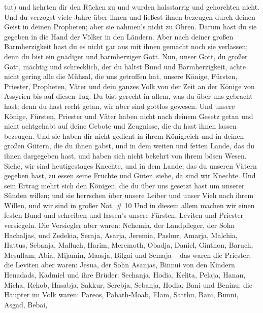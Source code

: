 tut) und kehrten dir den Rücken zu und wurden halsstarrig und gehorchten
nicht.  Und du verzogst viele Jahre über ihnen und ließest
ihnen bezeugen durch deinen Geist in deinen Propheten; aber sie nahmen's
nicht zu Ohren. Darum hast du sie gegeben in die Hand der Völker in den
Ländern.  Aber nach deiner großen Barmherzigkeit hast du es
nicht gar aus mit ihnen gemacht noch sie verlassen; denn du bist ein
gnädiger und barmherziger Gott.  Nun, unser Gott, du großer
Gott, mächtig und schrecklich, der du hältst Bund und Barmherzigkeit,
achte nicht gering alle die Mühsal, die uns getroffen hat, unsere
Könige, Fürsten, Priester, Propheten, Väter und dein ganzes Volk von der
Zeit an der Könige von Assyrien bis auf diesen Tag.  Du
bist gerecht in allem, was du über uns gebracht hast; denn du hast recht
getan, wir aber sind gottlos gewesen.  Und unsere Könige,
Fürsten, Priester und Väter haben nicht nach deinem Gesetz getan und
nicht achtgehabt auf deine Gebote und Zeugnisse, die du hast ihnen
lassen bezeugen.  Und sie haben dir nicht gedient in ihrem
Königreich und in deinen großen Gütern, die du ihnen gabst, und in dem
weiten und fetten Lande, das du ihnen dargegeben hast, und haben sich
nicht bekehrt von ihrem bösen Wesen.  Siehe, wir sind
heutigestages Knechte, und in dem Lande, das du unseren Vätern gegeben
hast, zu essen seine Früchte und Güter, siehe, da sind wir Knechte.
 Und sein Ertrag mehrt sich den Königen, die du über uns
gesetzt hast um unserer Sünden willen; und sie herrschen über unsere
Leiber und unser Vieh nach ihrem Willen, und wir sind in großer Not. \#
10  Und in diesem allem machen wir einen festen Bund und
schreiben und lassen's unsere Fürsten, Leviten und Priester versiegeln.
 Die Versiegler aber waren: Nehemia, der Landpfleger, der
Sohn Hachaljas, und Zedekia,  Seraja, Asarja, Jeremia,
 Pashur, Amarja, Malchia,  Hattus, Sebanja,
Malluch,  Harim, Meremoth, Obadja,  Daniel,
Ginthon, Baruch,  Mesullam, Abia, Mijamin, 
Maasja, Bilgai und Semaja -- das waren die Priester;  die
Leviten aber waren: Jesua, der Sohn Asanjas, Binnui von den Kindern
Henadads, Kadmiel  und ihre Brüder: Sechanja, Hodia,
Kelita, Pelaja, Hanan,  Micha, Rehob, Hasabja,
 Sakkur, Serebja, Sebanja,  Hodia, Bani und
Beninu;  die Häupter im Volk waren: Pareos, Pahath-Moab,
Elam, Satthu, Bani,  Bunni, Asgad, Bebai, 
